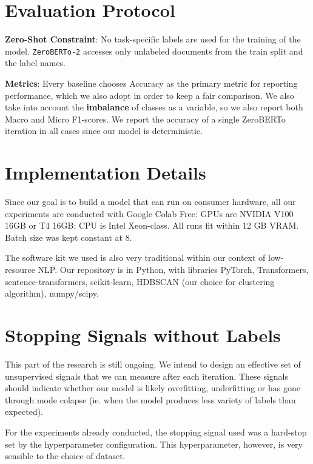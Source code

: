 \documentclass[]{politex-xico}
\begin{document}
\section{Evaluation Protocol}
\label{sec:protocol}

\textbf{Zero-Shot Constraint}: 
No task-specific labels are used for the training of the model. \texttt{ZeroBERTo-2} accesses only unlabeled documents from the train split and the label names.


\textbf{Metrics}: Every baseline chooses Accuracy as the primary metric for reporting performance, which we also adopt in order to keep a fair comparison. We also take into account the \textbf{imbalance} of classes as a variable, so we also report both Macro and Micro F1-scores. 
We report the accuracy of a single ZeroBERTo iteration in all cases since our model is deterministic. 


\section{Implementation Details}
\label{sec:implementation}



Since our goal is to build a model that can run on consumer hardware, all our experiments are conducted with Google Colab Free: GPUs are NVIDIA V100 16GB or T4 16GB; CPU is Intel Xeon-class.
All runs fit within 12 GB VRAM. Batch size was kept constant at 8.

The software kit we used is also very traditional within our context of low-resource NLP. Our repository is in Python, with libraries PyTorch, Transformers, sentence-transformers, scikit-learn, HDBSCAN (our choice for clustering algorithm), numpy/scipy.


\section{Stopping Signals without Labels}
\label{sec:stopping_protocol}

This part of the research is still ongoing. We intend to design an effective set of unsupervised signals that we can measure after each iteration. These signals should indicate whether our model is likely overfitting, underfitting or has gone through mode colapse (ie. when the model produces less variety of labels than expected). 

For the experiments already conducted, the stopping signal used was a hard-stop set by the hyperparameter configuration. This hyperparameter, however, is very sensible to the choice of dataset.
\end{document}
